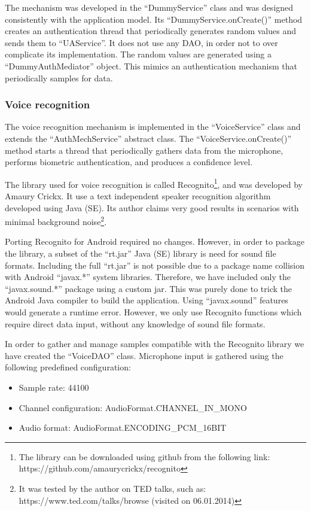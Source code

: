 The mechanism was developed in the ``DummyService'' class and was designed consistently with the application model. Its ``DummyService.onCreate()'' method creates an authentication thread that periodically generates random values and sends them to ``UAService''. It does not use any DAO, in order not to over complicate its implementation. The random values are generated using a ``DummyAuthMediator'' object. This mimics an authentication mechanism that periodically samples for data.  

\subsubsection{Voice recognition}
The voice recognition mechanism is implemented in the ``VoiceService'' class and extends the ``AuthMechService'' abstract class. The ``VoiceService.onCreate()'' method starts a thread that periodically gathers data from the microphone, performs biometric authentication, and produces a confidence level.

The library used for voice recognition is called Recognito\footnote{The library can be downloaded using github from the following link: https://github.com/amaurycrickx/recognito}, and was developed by Amaury Crickx. It use a text independent speaker recognition algorithm developed using Java (SE). Its author claims very good results in scenarios with minimal background noise\footnote{It was tested by the author on TED talks, such as:  https://www.ted.com/talks/browse (visited on 06.01.2014)}.

Porting Recognito for Android required no changes. However, in order to package the library, a subset of the ``rt.jar'' Java (SE) library is need for sound file formats. Including the full ``rt.jar'' is not possible due to a package name collision with Android ``javax.*'' system libraries. Therefore, we have included only the ``javax.sound.*'' package using a custom jar. This was purely done to trick the Android Java compiler to build the application. Using ``javax.sound'' features would generate a runtime error. However, we only use Recognito functions which require direct data input, without any knowledge of sound file formats.

In order to gather and manage samples compatible with the Recognito library we have created the ``VoiceDAO'' class. Microphone input is gathered using the following predefined configuration:
\begin{itemize}
	\item Sample rate: 44100
	\item Channel configuration: AudioFormat.CHANNEL\_IN\_MONO
	\item Audio format: AudioFormat.ENCODING\_PCM\_16BIT
\end{itemize}

